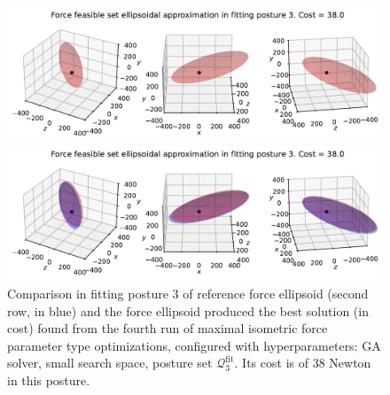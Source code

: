 \begin{figure}[!htb]
    \centering
    \captionsetup{justification=centering}
    
    \begin{minipage}{0.8\linewidth}
        \captionsetup{justification=centering}
        \centering
        \includegraphics[trim={0 0 0 0}, clip, width=1\linewidth]{img/chapter_4/reconstruction_stanford_imgs/ellipsoid_genetic_p3_fiso_small_output_3214882_trial_4_fitting_posture_3.pdf}
    \end{minipage}
    \begin{minipage}{0.8\linewidth}
        \captionsetup{justification=centering}
        \centering
        \includegraphics[trim={0 0 0 20}, clip, width=1\linewidth]{img/chapter_4/reconstruction_stanford_imgs/ellipsoid_genetic_p3_fiso_small_output_3214882_trial_4_fitting_posture_3_with_stanford.pdf}
    \end{minipage}
    \caption{Comparison in fitting posture 3 of reference force ellipsoid (second row, in blue) and the force ellipsoid produced the best solution (in cost) found from the fourth run of maximal isometric force parameter type optimizations, configured with hyperparameters: GA solver, small search space, posture set $\mathcal{Q}_3^{\text{fit}}$. Its cost is of $38$ Newton in this posture.}
    \label{fig:ellipsoid_genetic_p3_fiso_small_output_3214882_trial_4_fitting_posture_3}
\end{figure}

